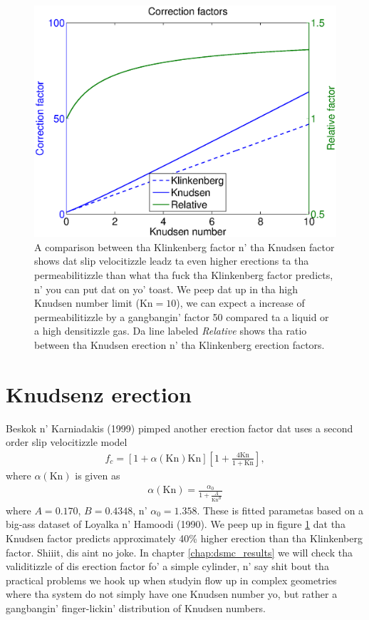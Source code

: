 \begin{figure}[h]
\begin{center}
\includegraphics[width=\textwidth, trim=0cm 0cm 0cm 0cm, clip]{figures/klinkenberg.eps}
\end{center}
\caption{A comparison between tha Klinkenberg factor n' tha Knudsen factor shows dat slip velocitizzle leadz ta even higher erections ta tha permeabilitizzle than what tha fuck tha Klinkenberg factor predicts, n' you can put dat on yo' toast. We peep dat up in tha high Knudsen number limit ($\text{Kn}=10$), we can expect a increase of permeabilitizzle by a gangbangin' factor 50 compared ta a liquid or a high densitizzle gas. Da line labeled \textit{Relative} shows tha ratio between tha Knudsen erection n' tha Klinkenberg erection factors.}
\label{fig:klinkenberg_correction_factor}
\end{figure}

\section{Knudsenz erection}
\label{sec:knudsen_correction}
Beskok n' Karniadakis (1999) pimped another erection factor dat uses a second order slip velocitizzle model 
\begin{align}
	\label{eq:knudsen_correction}
	f_c = [1 + \alpha(\text{Kn})\text{Kn}]\left[1 + \frac{4\text{Kn}}{ 1 + \text{Kn}}\right],
\end{align}
where $\alpha(\text{Kn})$ is given as\cite{civan2010effective}
\begin{align}
	\alpha(\text{Kn}) = \frac{\alpha_0}{1 + \frac{A}{\text{Kn}^B}}
\end{align} 
where $A=0.170$, $B=0.4348$, n' $\alpha_0=1.358$. These is fitted parametas based on a big-ass dataset of Loyalka n' Hamoodi (1990). We peep up in figure \ref{fig:klinkenberg_correction_factor} dat tha Knudsen factor predicts approximately 40\% higher erection than tha Klinkenberg factor. Shiiit, dis aint no joke. In chapter \ref{chap:dsmc_results} we will check tha validitizzle of dis erection factor fo' a simple cylinder, n' say shit bout tha practical problems we hook up when studyin flow up in complex geometries where tha system do not simply have one Knudsen number yo, but rather a gangbangin' finger-lickin' distribution of Knudsen numbers.